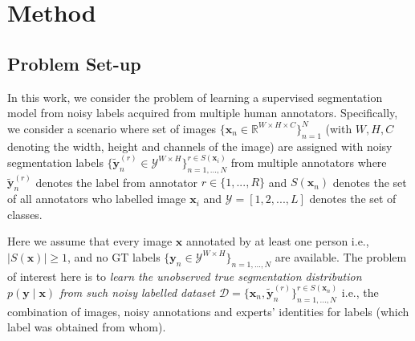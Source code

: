\section{Method}
\vspace{-2mm}




\subsection{Problem Set-up}
\vspace{-2mm}

In this work, we consider the problem of learning a supervised segmentation model from noisy labels acquired from multiple human annotators. Specifically, we consider a scenario where set of images $\{\textbf{x}_n \in \mathbb{R}^{W\times H\times C}\}_{n=1}^N$ (with $W, H, C$ denoting the width, height and channels of the image) are assigned with noisy segmentation labels $\{\tilde{\textbf{y}}_n^{(r)} \in \mathcal{Y}^{W\times H}\}_{n=1,...,N}^{r\in S(\mathbf{x}_i)}$ from multiple annotators where $\tilde{\textbf{y}}_n^{(r)}$ denotes the label from annotator $r \in \{1,...,R\}$ and $S(\mathbf{x}_n)$ denotes the set of all annotators who labelled image $\textbf{x}_i$ and $\mathcal{Y}=[1, 2,...,L]$ denotes the set of classes. 

Here we assume that every image $\mathbf{x}$ annotated by at least one person i.e., $|S(\mathbf{x})|\geq 1$, and no GT labels $\{\textbf{y}_n \in \mathcal{Y}^{W\times H} \}_{n=1,...,N}$ are available. The problem of interest here is to \textit{learn the unobserved true segmentation distribution $p(\textbf{y} \mid \textbf{x})$ from such noisy labelled dataset $\mathcal{D}=\{\textbf{x}_n, \tilde{\textbf{y}}_n^{(r)}\}^{r\in S(\mathbf{x}_n)}_{n=1,...,N}$} i.e., the combination of images, noisy annotations and experts' identities for labels (which label was obtained from whom). 

